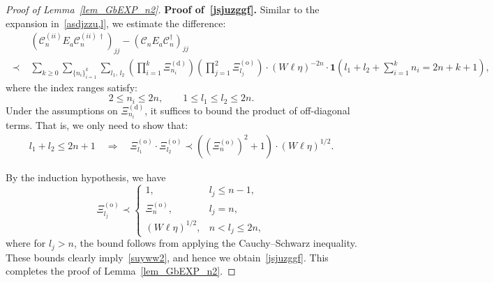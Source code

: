 \documentclass[10pt,reqno]{article}
\theoremstyle{plain} %
\theoremstyle{remark}
\numberwithin{equation}{section}
\begin{document}
\begin{proof}[Proof of Lemma~\ref{lem_GbEXP_n2}]
\bigskip
\bigskip
\noindent
\textbf{Proof of~\eqref{jsjuzggf}.} Similar to the expansion in~\eqref{asdjzzu,l}, we estimate the difference:
\begin{align}\label{asdjzzu,l2}
&\left( \mathcal{C}^{(ii)}_n E_a \mathcal{C}^{(ii)\, \dagger}_n \right)_{jj} 
- \left( \mathcal{C}_n E_a \mathcal{C}^\dagger_n \right)_{jj}
\\\nonumber
  \;\prec\; &  \sum_{k \ge 0} \sum_{\{n_i\}_{i=1}^k} \sum_{l_1,\, l_2}
\left( \prod_{i=1}^k \Xi^{(\mathrm{d})}_{n_i} \right)
\left( \prod_{j=1}^2 \Xi^{(\mathrm{o})}_{l_j} \right) \cdot (W \ell \eta)^{-2n}
\cdot \mathbf{1} \left( l_1 + l_2 + \sum_{i=1}^k n_i = 2n + k + 1 \right),
\end{align}
where the index ranges satisfy:
\[
2 \le n_i \le 2n, \qquad 1 \le l_1 \le l_2 \le 2n.
\]
Under the assumptions on \( \Xi^{(\mathrm{d})}_{n_i} \), it suffices to bound the product of off-diagonal terms. That is, we only need to show that:
\begin{align}\label{suyww2}
l_1 + l_2 \le 2n + 1 \quad \Longrightarrow \quad 
\Xi^{(\mathrm{o})}_{l_1} \cdot \Xi^{(\mathrm{o})}_{l_2} 
\prec \left( \left( \Xi^{(\mathrm{o})}_n \right)^2 + 1 \right) \cdot (W \ell \eta)^{1/2}.
\end{align}

\medskip

By the induction hypothesis, we have 
\[
\Xi^{(\mathrm{o})}_{l_j} \prec
\begin{cases}
1, & l_j \le n - 1, \\[6pt]
\Xi^{(\mathrm{o})}_n, & l_j = n, \\[6pt]
(W \ell \eta)^{1/2}, & n < l_j \le 2n,
\end{cases}
\]
where for \( l_j > n \), the bound follows from applying the Cauchy–Schwarz inequality.
These bounds clearly imply~\eqref{suyww2}, and hence we obtain~\eqref{jsjuzggf}. This completes the proof of Lemma~\ref{lem_GbEXP_n2}.
 \end{proof}
 
\end{document}
